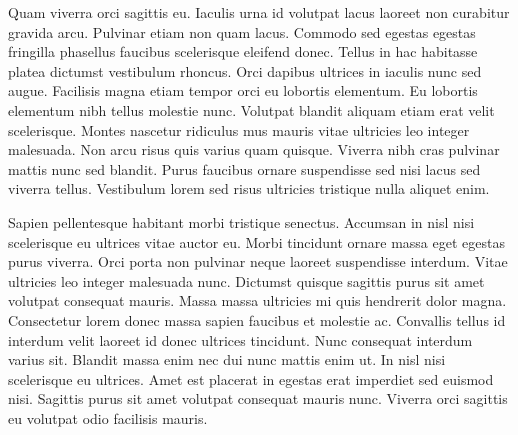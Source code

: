 Quam viverra orci sagittis eu. Iaculis urna id volutpat lacus laoreet non curabitur gravida arcu. Pulvinar etiam non quam lacus. Commodo sed egestas egestas fringilla phasellus faucibus scelerisque eleifend donec. Tellus in hac habitasse platea dictumst vestibulum rhoncus. Orci dapibus ultrices in iaculis nunc sed augue. Facilisis magna etiam tempor orci eu lobortis elementum. Eu lobortis elementum nibh tellus molestie nunc. Volutpat blandit aliquam etiam erat velit scelerisque. Montes nascetur ridiculus mus mauris vitae ultricies leo integer malesuada. Non arcu risus quis varius quam quisque. Viverra nibh cras pulvinar mattis nunc sed blandit. Purus faucibus ornare suspendisse sed nisi lacus sed viverra tellus. Vestibulum lorem sed risus ultricies tristique nulla aliquet enim.

Sapien pellentesque habitant morbi tristique senectus. Accumsan in nisl nisi scelerisque eu ultrices vitae auctor eu. Morbi tincidunt ornare massa eget egestas purus viverra. Orci porta non pulvinar neque laoreet suspendisse interdum. Vitae ultricies leo integer malesuada nunc. Dictumst quisque sagittis purus sit amet volutpat consequat mauris. Massa massa ultricies mi quis hendrerit dolor magna. Consectetur lorem donec massa sapien faucibus et molestie ac. Convallis tellus id interdum velit laoreet id donec ultrices tincidunt. Nunc consequat interdum varius sit. Blandit massa enim nec dui nunc mattis enim ut. In nisl nisi scelerisque eu ultrices. Amet est placerat in egestas erat imperdiet sed euismod nisi. Sagittis purus sit amet volutpat consequat mauris nunc. Viverra orci sagittis eu volutpat odio facilisis mauris.